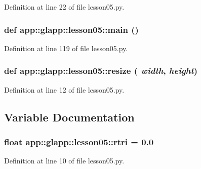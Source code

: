 Definition at line 22 of file lesson05.py.
\subsubsection{\setlength{\rightskip}{0pt plus 5cm}def app::glapp::lesson05::main ()}\label{namespaceapp_1_1glapp_1_1lesson05_92566847170716aaea5173f6e34860c9}




Definition at line 119 of file lesson05.py.
\subsubsection{\setlength{\rightskip}{0pt plus 5cm}def app::glapp::lesson05::resize ( {\em width},  {\em height})}\label{namespaceapp_1_1glapp_1_1lesson05_c09b086f78026fe347e0a0a1bcfd8af9}




Definition at line 12 of file lesson05.py.

\subsection{Variable Documentation}
\subsubsection{\setlength{\rightskip}{0pt plus 5cm}float {\bf app::glapp::lesson05::rtri} = 0.0\hspace{0.3cm}{\tt  [static]}}\label{namespaceapp_1_1glapp_1_1lesson05_4ff00d2991c6a37ab3d4eb134c8cfae7}




Definition at line 10 of file lesson05.py.